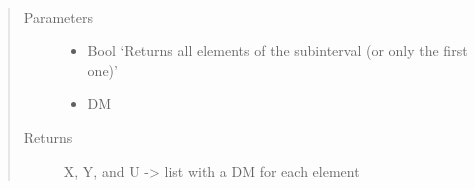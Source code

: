 \documentclass[letterpaper,10pt,english]{sphinxmanual}
\begin{document}
\begin{fulllineitems}
\begin{fulllineitems}
\end{fulllineitems}


\begin{fulllineitems}
\label{\detokenize{yaocptool.methods.classic:yaocptool.methods.classic.collocationscheme.CollocationScheme.split_x_y_and_u}}~\begin{quote}\begin{description}
\item[{Parameters}] \leavevmode\begin{itemize}
\item {} 
 \textendash{} Bool ‘Returns all elements of the subinterval (or only the first one)’

\item {} 
 \textendash{} DM

\end{itemize}

\item[{Returns}] \leavevmode
X, Y, and U -\textgreater{} list with a DM for each element

\end{description}\end{quote}

\end{fulllineitems}


\begin{fulllineitems}
\label{\detokenize{yaocptool.methods.classic:yaocptool.methods.classic.collocationscheme.CollocationScheme.time_interpolation}}
\end{fulllineitems}


\begin{fulllineitems}
\label{\detokenize{yaocptool.methods.classic:yaocptool.methods.classic.collocationscheme.CollocationScheme.time_interpolation_algebraics}}
\end{fulllineitems}


\end{fulllineitems}
\end{document}
